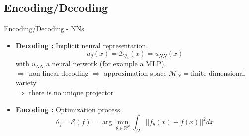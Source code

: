 \subsection{Encoding/Decoding}

\begin{frame}{Encoding/Decoding - NNs}
	\begin{itemize}[\textbullet]
		\item \textbf{Decoding :} Implicit neural representation.
		\begin{equation*}
			u_\theta(x)=\mathcal{D}_{\theta_u}(x)=u_{NN}(x)
		\end{equation*}
		with $u_{NN}$ a neural network (for example a MLP). \\
		$\Rightarrow$ non-linear decoding $\Rightarrow$ approximation space $\mathcal{M}_N$ = finite-dimensional variety \\
		$\Rightarrow$ there is no unique projector
		\item \textbf{Encoding :} Optimization process.
		\begin{equation*}
			\theta_f=\mathcal{E}(f)=\arg\min_{\theta\in\mathbb{R}^N}\int_\Omega ||f_\theta(x)-f(x)||^2 dx
		\end{equation*}
	\end{itemize}
\end{frame}

